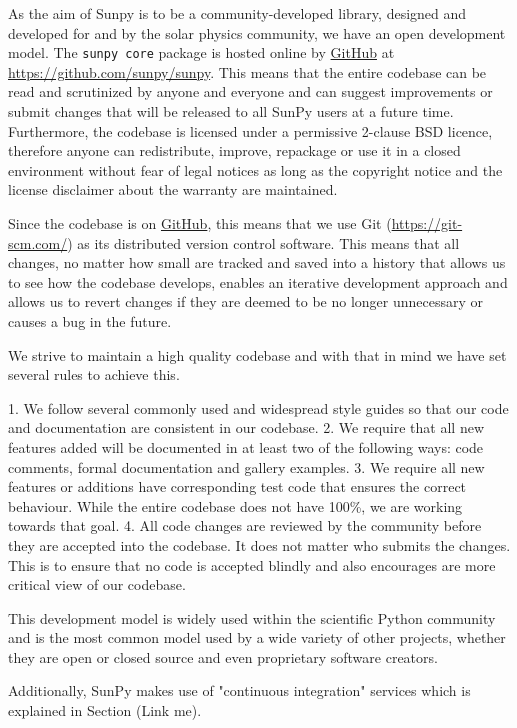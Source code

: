 As the aim of Sunpy is to be a community-developed library, designed and developed for and by the solar physics community, we have an open development model. 
The \verb|sunpy core| package is hosted online by \href{http://github.com}{GitHub} at \url{https://github.com/sunpy/sunpy}.
This means that the entire codebase can be read and scrutinized by anyone and everyone and can suggest improvements or submit changes that will be released to all SunPy users at a future time.
Furthermore, the codebase is licensed under a permissive 2-clause BSD licence, therefore anyone can redistribute, improve, repackage or use it in a closed environment without fear of legal notices as long as the copyright notice and the license disclaimer about the warranty are maintained.

Since the codebase is on \href{http://github.com}{GitHub}, this means that we use Git (\url{https://git-scm.com/}) as its distributed version control software. This means that all changes, no matter how small are tracked and saved into a history that allows us to see how the codebase develops, enables an iterative development approach and allows us to revert changes if they are deemed to be no longer unnecessary or causes a bug in the future.

We strive to  maintain a high quality codebase and with that in mind we have set several rules to achieve this.

1. We follow several commonly used and widespread style guides so that our code and documentation are consistent in our codebase.
2. We require that all new features added will be documented in at least two of the following ways: code comments, formal documentation and gallery examples.
3. We require all new features or additions have corresponding test code that ensures the correct behaviour. While the entire codebase does not have 100\%, we are working towards that goal.
4.  All code changes are reviewed by the community before they are accepted into the codebase. It does not matter who submits the changes.  This is to ensure that no code is accepted blindly and also encourages are more critical view of our codebase. 

This development model is widely used within the scientific Python  community and is the most common model used by a wide variety of other projects, whether they are open or closed source and even proprietary software creators.

Additionally, SunPy makes use of "continuous integration" services which is explained in Section (Link me).

